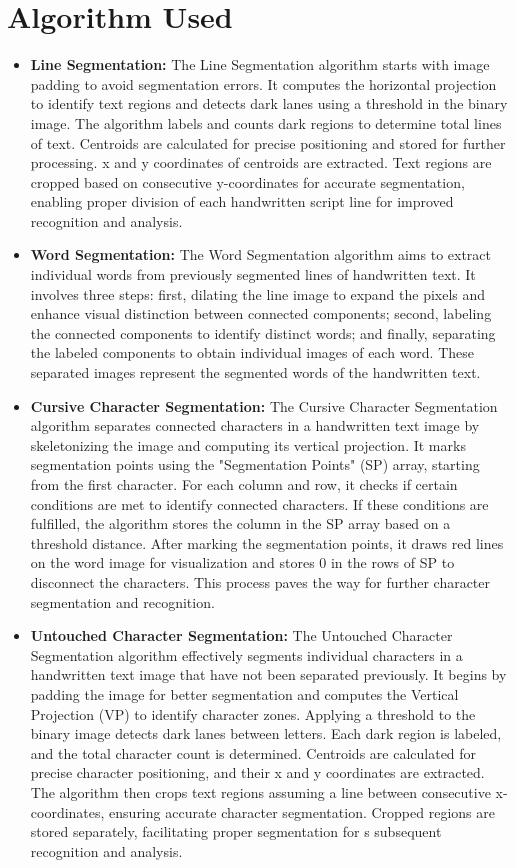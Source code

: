 \section{Algorithm Used}
\begin{itemize}
    \item \textbf{Line Segmentation:} The Line Segmentation algorithm starts with image padding to avoid segmentation errors. It computes the horizontal projection to identify text regions and detects dark lanes using a threshold in the binary image. The algorithm labels and counts dark regions to determine total lines of text. Centroids are calculated for precise positioning and stored for further processing. x and y coordinates of centroids are extracted. Text regions are cropped based on consecutive y-coordinates for accurate segmentation, enabling proper division of each handwritten script line for improved recognition and analysis.
    \item \textbf{Word Segmentation:} The Word Segmentation algorithm aims to extract individual words from previously segmented lines of handwritten text. It involves three steps: first, dilating the line image to expand the pixels and enhance visual distinction between connected components; second, labeling the connected components to identify distinct words; and finally, separating the labeled components to obtain individual images of each word. These separated images represent the segmented words of the handwritten text.
    \item \textbf{Cursive Character Segmentation:} The Cursive Character Segmentation algorithm separates connected characters in a handwritten text image by skeletonizing the image and computing its vertical projection. It marks segmentation points using the "Segmentation Points" (SP) array, starting from the first character. For each column and row, it checks if certain conditions are met to identify connected characters. If these conditions are fulfilled, the algorithm stores the column in the SP array based on a threshold distance. After marking the segmentation points, it draws red lines on the word image for visualization and stores 0 in the rows of SP to disconnect the characters. This process paves the way for further character segmentation and recognition.
    \item \textbf{Untouched Character Segmentation:} The Untouched Character Segmentation algorithm effectively segments individual characters in a handwritten text image that have not been separated previously. It begins by padding the image for better segmentation and computes the Vertical Projection (VP) to identify character zones. Applying a threshold to the binary image detects dark lanes between letters. Each dark region is labeled, and the total character count is determined. Centroids are calculated for precise character positioning, and their x and y coordinates are extracted. The algorithm then crops text regions assuming a line between consecutive x-coordinates, ensuring accurate character segmentation. Cropped regions are stored separately, facilitating proper segmentation for s subsequent recognition and analysis.
  \end{itemize}
  \newpage
